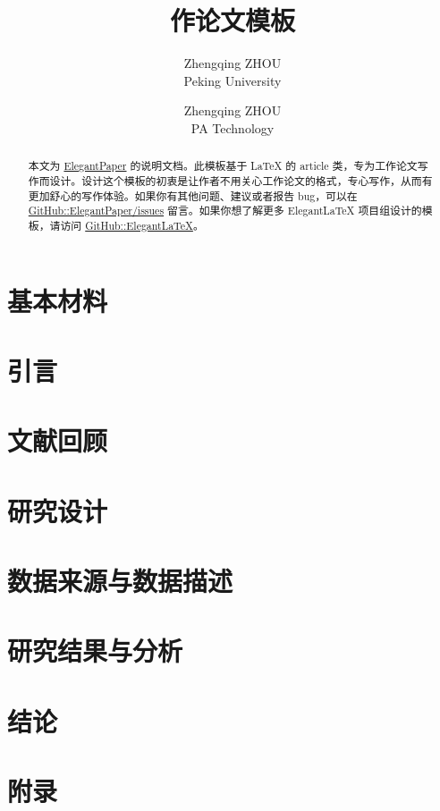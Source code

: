\documentclass[lang=cn,a4paper]{elegantpaper}
\title{作论文模板}
\author{Zhengqing ZHOU \\ Peking University \and Zhengqing ZHOU \\ PA Technology}
\institute{\href{https://pe.pku.edu.cn/}{体育教研部}}
\date{\zhtoday}
\begin{document}
\begin{titlepage}
\clearpage\maketitle
\thispagestyle{empty}

\begin{abstract}
本文为 \href{https://github.com/ElegantLaTeX/ElegantPaper/}{ElegantPaper} 的说明文档。此模板基于 \LaTeX{} 的 article 类，专为工作论文写作而设计。设计这个模板的初衷是让作者不用关心工作论文的格式，专心写作，从而有更加舒心的写作体验。如果你有其他问题、建议或者报告 bug，可以在 \href{https://github.com/ElegantLaTeX/ElegantPaper/issues}{GitHub::ElegantPaper/issues} 留言。如果你想了解更多 Elegant\LaTeX{} 项目组设计的模板，请访问 \href{https://github.com/ElegantLaTeX/}{GitHub::ElegantLaTeX}。
\end{abstract}

\end{titlepage}

	\section{基本材料} \label{sec:text}
	
	\section{引言} \label{sec:introduction}
	
	\section{文献回顾} \label{sec:review}
	
	\section{研究设计} \label{sec:design}
	
    \section{数据来源与数据描述}\label{sec:data}
	
    \section{研究结果与分析}\label{sec:results}
	
	\section{结论} \label{sec:conclusion}
	
	\newpage
%	
%	
	\nocite{*}
	\printbibliography[heading=bibintoc, title=\ebibname]
	\newpage
	\appendix
	\section{附录} \label{sec:appendix}
	
	\addappheadtotoc
\end{document}
